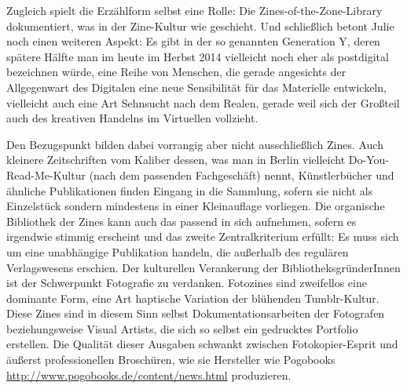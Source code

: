 \documentclass[a4paper,
fontsize=11pt,
oneside,
numbers=noperiodatend,
parskip=half-,
bibliography=totoc,
final
]{scrartcl}
\begin{document}
Zugleich spielt die Erzählform selbst eine Rolle: Die
Zines-of-the-Zone-Library dokumentiert, was in der Zine-Kultur wie
geschieht. Und schließlich betont Julie noch einen weiteren Aspekt: Es
gibt in der so genannten Generation Y, deren spätere Hälfte man im heute
im Herbst 2014 vielleicht noch eher als postdigital bezeichnen würde,
eine Reihe von Menschen, die gerade angesichts der Allgegenwart des
Digitalen eine neue Sensibilität für das Materielle entwickeln,
vielleicht auch eine Art Sehnsucht nach dem Realen, gerade weil sich der
Großteil auch des kreativen Handelns im Virtuellen vollzieht.

Den Bezugspunkt bilden dabei vorrangig aber nicht ausschließlich Zines.
Auch kleinere Zeitschriften vom Kaliber dessen, was man in Berlin
vielleicht Do-You-Read-Me-Kultur (nach dem passenden Fachgeschäft)
nennt, Künstlerbücher und ähnliche Publikationen finden Eingang in die
Sammlung, sofern sie nicht als Einzelstück sondern mindestens in einer
Kleinauflage vorliegen. Die organische Bibliothek der Zines kann auch
das passend in sich aufnehmen, sofern es irgendwie stimmig erscheint und
das zweite Zentralkriterium erfüllt: Es muss sich um eine unabhängige
Publikation handeln, die außerhalb des regulären Verlagswesens erschien.
Der kulturellen Verankerung der BibliotheksgründerInnen ist der
Schwerpunkt Fotografie zu verdanken. Fotozines sind zweifellos eine
dominante Form, eine Art haptische Variation der blühenden
Tumblr-Kultur. Diese Zines sind in diesem Sinn selbst
Dokumentationsarbeiten der Fotografen beziehungsweise Visual Artists,
die sich so selbst ein gedrucktes Portfolio erstellen. Die Qualität
dieser Ausgaben schwankt zwischen Fotokopier-Esprit und äußerst
professionellen Broschüren, wie sie Hersteller wie Pogobooks
\url{http://www.pogobooks.de/content/news.html} produzieren.
\end{document}
